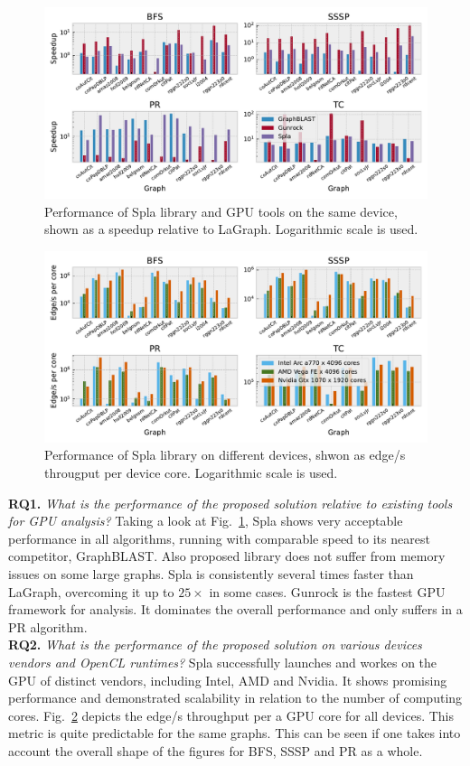 \begin{figure}[tbp]
\centering
\includegraphics[width=1.0\linewidth]{plots/rq1_rel.pdf}
\caption{Performance of Spla library and GPU tools on the same device, shown as a speedup relative to LaGraph. Logarithmic scale is used.}
\label{fig:rq1_chart}
\end{figure}

\begin{figure}[tbp]
\centering
\includegraphics[width=1.0\linewidth]{plots/rq2_cores.pdf}
\caption{Performance of Spla library on different devices, shwon as edge/s througput per device core. Logarithmic scale is used.}
\label{fig:rq2_chart}
\end{figure}

\textbf{RQ1.} \textit{What is the performance of the proposed solution relative to existing tools for GPU analysis?} Taking a look at Fig.~\ref{fig:rq1_chart}, Spla shows very acceptable performance in all algorithms, running with comparable speed to its nearest competitor, GraphBLAST. Also proposed library does not suffer from memory issues on some large graphs. Spla is consistently several times faster than LaGraph, overcoming it up to $25\times$ in some cases. Gunrock is the fastest GPU framework for analysis. It dominates the overall performance and only suffers in a PR algorithm.\\

\textbf{RQ2.} \textit{What is the performance of the proposed solution on various devices vendors and OpenCL runtimes?} Spla successfully launches and workes on the GPU of distinct vendors, including Intel, AMD and Nvidia. It shows promising performance and demonstrated scalability in relation to the number of computing cores. Fig.~\ref{fig:rq2_chart} depicts the edge/s throughput per a GPU core for all devices. This metric is quite predictable for the same graphs. This can be seen if one takes into account the overall shape of the figures for BFS, SSSP and PR as a whole.